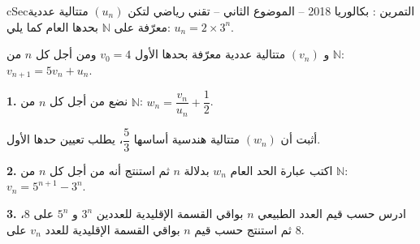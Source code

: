 \documentclass[12pt,a4paper]{article}
\newenvironment{BOX}[2]{\begin{otherlanguage}{english}\begin{arbox}{#1}{#2}}{\end{arbox}\end{otherlanguage}}
\newcounter{exo}
\newenvironment{tamrin}[1]{\stepcounter{exo}\begin{BOX}{cSec}{التمرين \theexo: #1}}{\end{BOX}}
\newcommand{\N}{\mathbb{N}}
\newcommand{\QQ}[1]{\par\smallskip\textbf{#1.} }
\begin{document}
\begin{tamrin}{بكالوريا 2018 -- الموضوع الثاني -- تقني رياضي}
لتكن $(u_n)$ متتالية عددية معرّفة على $\N$ بحدها العام كما يلي: $u_n=2\times3^n$.

و $(v_n)$ متتالية عددية معرّفة بحدها الأول $v_0=4$ ومن أجل كل $n$ من $\N$: $v_{n+1}=5v_n+u_n$.

\QQ{1} نضع من أجل كل $n$ من $\N$: $w_n=\dfrac{v_n}{u_n}+\dfrac12$.

أثبت أن $(w_n)$ متتالية هندسية أساسها $\dfrac53$، يطلب تعيين حدها الأول.

\QQ{2} اكتب عبارة الحد العام $w_n$ بدلالة $n$ ثم استنتج أنه من أجل كل $n$ من $\N$: $v_n=5^{n+1}-3^n$.

\QQ{3} ادرس حسب قيم العدد الطبيعي $n$ بواقي القسمة الإقليدية للعددين $3^n$ و $5^n$ على $8$، ثم استنتج حسب قيم $n$ بواقي القسمة الإقليدية للعدد $v_n$ على $8$.
\end{tamrin}
\end{document}
